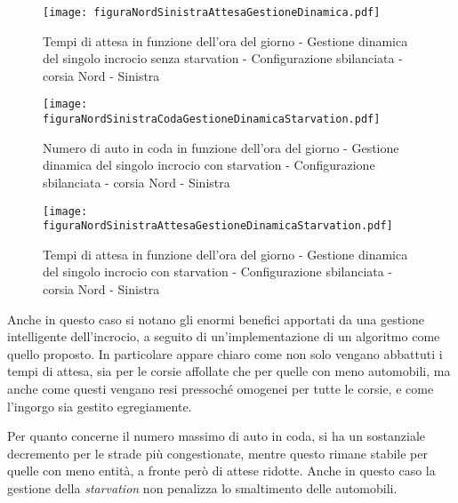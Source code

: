 \newpage

\begin{figure}[H]
\centering
  \texttt{[image: figuraNordSinistraAttesaGestioneDinamica.pdf]}
  \caption{Tempi di attesa in funzione dell'ora del giorno - Gestione dinamica del singolo incrocio senza starvation - Configurazione sbilanciata - corsia Nord - Sinistra}
  \label{fig:}
\end{figure}
\begin{figure}[H]
\centering
  \texttt{[image: figuraNordSinistraCodaGestioneDinamicaStarvation.pdf]}
  \caption{Numero di auto in coda in funzione dell'ora del giorno - Gestione dinamica del singolo incrocio con starvation - Configurazione sbilanciata - corsia Nord - Sinistra}
  \label{fig:}
\end{figure}
\newpage
\begin{figure}[H]
\centering
  \texttt{[image: figuraNordSinistraAttesaGestioneDinamicaStarvation.pdf]}
  \caption{Tempi di attesa in funzione dell'ora del giorno - Gestione dinamica del singolo incrocio con starvation - Configurazione sbilanciata - corsia Nord - Sinistra}
  \label{fig:}
\end{figure}

Anche in questo caso si notano gli enormi benefici apportati da una gestione intelligente dell'incrocio, a seguito di un'implementazione di un algoritmo come quello proposto. In particolare appare chiaro come non solo vengano abbattuti i tempi di attesa, sia per le corsie affollate che per quelle con meno automobili, ma anche come questi vengano resi pressoché omogenei per tutte le corsie, e come l'ingorgo sia gestito egregiamente.

Per quanto concerne il numero massimo di auto in coda, si ha un sostanziale decremento per le strade più congestionate, mentre questo rimane stabile per quelle con meno entità, a fronte però di attese ridotte. Anche in questo caso la gestione della \textit{starvation} non penalizza lo smaltimento delle automobili.
\newline

